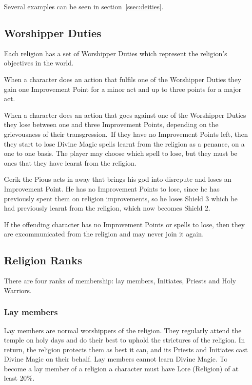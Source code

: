 Several examples can be seen in section~\ref{ssec:deities}.

\subsection{Worshipper Duties}
Each religion has a set of Worshipper Duties which represent the religion’s objectives in the world.

When a character does an action that fulfils one of the Worshipper Duties they gain one Improvement Point for a minor act and up to three points for a major act.

When a character does an action that goes against one of the Worshipper Duties they lose between one and three Improvement Points, depending on the grievousness of their transgression. If they have no Improvement Points left, then they start to lose Divine Magic spells learnt from the religion as a penance, on a one to one basis. The player may choose which spell to lose, but they must be ones that they have learnt from the religion.

\begin{rpg-examplebox}
Gerik the Pious acts in away that brings his god into disrepute and loses an Improvement Point. He has no Improvement Points to lose, since he has previously spent them on religion improvements, so he loses Shield 3 which he had previously learnt from the religion, which now becomes Shield 2.
\end{rpg-examplebox}

If the offending character has no Improvement Points or spells to lose, then they are excommunicated from the religion and may never join it again.

\subsection{Religion Ranks}
There are four ranks of membership: lay members, Initiates, Priests and Holy Warriors.

\subsubsection{Lay members}
Lay members are normal worshippers of the religion. They regularly attend the temple on holy days and do their best to uphold the strictures of the religion. In return, the religion protects them as best it can, and its Priests and Initiates cast Divine Magic on their behalf. Lay members cannot learn Divine Magic. To become a lay member of a religion a character must have Lore (Religion) of at least 20\%. 

